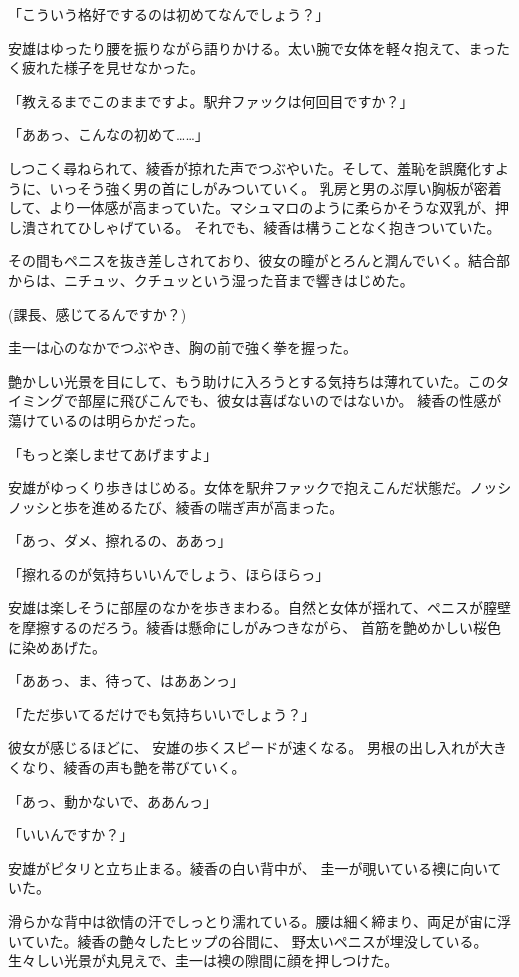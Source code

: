 ﻿\documentclass[
    book,tate,
    line_length=30zw,
    jafontsize=12pt,
    paper=b5j,
    landscape,
    ]{jlreq}
\begin{document}
「こういう格好でするのは初めてなんでしょう？」

安雄はゆったり腰を振りながら語りかける。太い腕で女体を軽々抱えて、まったく疲れた様子を見せなかった。

「教えるまでこのままですよ。駅弁ファックは何回目ですか？」

「ああっ、こんなの初めて……」

しつこく尋ねられて、綾香が掠れた声でつぶやいた。そして、羞恥を誤魔化すように、いっそう強く男の首にしがみついていく。
乳房と男のぶ厚い胸板が密着して、より一体感が高まっていた。マシュマロのように柔らかそうな双乳が、押し潰されてひしゃげている。
それでも、綾香は構うことなく抱きついていた。

その間もペニスを抜き差しされており、彼女の瞳がとろんと潤んでいく。結合部からは、ニチュッ、クチュッという湿った音まで響きはじめた。

(課長、感じてるんですか？)

圭一は心のなかでつぶやき、胸の前で強く拳を握った。

艶かしい光景を目にして、もう助けに入ろうとする気持ちは薄れていた。このタイミングで部屋に飛びこんでも、彼女は喜ばないのではないか。
綾香の性感が蕩けているのは明らかだった。

「もっと楽しませてあげますよ」

安雄がゆっくり歩きはじめる。女体を駅弁ファックで抱えこんだ状態だ。ノッシノッシと歩を進めるたび、綾香の喘ぎ声が高まった。

「あっ、ダメ、擦れるの、ああっ」

「擦れるのが気持ちいいんでしょう、ほらほらっ」

安雄は楽しそうに部屋のなかを歩きまわる。自然と女体が揺れて、ペニスが膣壁を摩擦するのだろう。綾香は懸命にしがみつきながら、
首筋を艶めかしい桜色に染めあげた。

「ああっ、ま、待って、はああンっ」

「ただ歩いてるだけでも気持ちいいでしょう？」

彼女が感じるほどに、 安雄の歩くスピードが速くなる。 男根の出し入れが大きくなり、綾香の声も艶を帯びていく。

「あっ、動かないで、ああんっ」

「いいんですか？」

安雄がピタリと立ち止まる。綾香の白い背中が、 圭一が覗いている襖に向いていた。

滑らかな背中は欲情の汗でしっとり濡れている。腰は細く締まり、両足が宙に浮いていた。綾香の艶々したヒップの谷間に、
野太いペニスが埋没している。生々しい光景が丸見えで、圭一は襖の隙間に顔を押しつけた。
\end{document}
